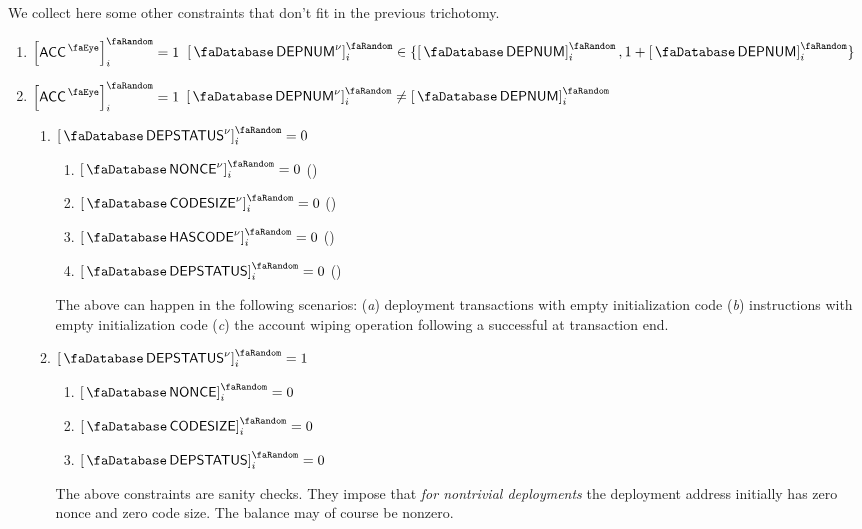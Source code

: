 We collect here some other constraints that don't fit in the previous trichotomy.
\begin{enumerate}
	\item
		\If $\order{\peekAccount} _{i} = 1$
		\Then $\order{\accDeploymentNumber \new }_{i} \in \{ \order{\accDeploymentNumber  }_{i}, 1 + \order{\accDeploymentNumber  }_{i} \}$
	\item
		\If $\order{\peekAccount} _{i} = 1$
		\et $\order{\accDeploymentNumber \new }_{i} \neq \order{\accDeploymentNumber  }_{i}$
		\begin{enumerate}
			\item
				\If $\order{\accDeploymentStatus \new }_{i} = 0$
				\Then
				\begin{enumerate}
					\item $\order{\accNonce        \new } _{i} = 0$ \quad (\trash)
					\item $\order{\accCodesize     \new } _{i} = 0$ \quad (\trash)
					\item $\order{\accHasCode      \new } _{i} = 0$ \quad (\trash)
					\item $\order{\accDeploymentStatus  } _{i} = 0$ \quad (\trash)
				\end{enumerate}
				\saNote{}
				The above can happen in the following scenarios:
				(\emph{a}) deployment transactions with empty initialization code
				(\emph{b})  instructions with empty initialization code
				(\emph{c}) the account wiping operation following a successful  at transaction end.
			\item
				\If $\order{\accDeploymentStatus \new }_{i} = 1$
				\Then
				\begin{enumerate}
					\item $\order{\accNonce             } _{i} = 0$
					\item $\order{\accCodesize          } _{i} = 0$
					\item $\order{\accDeploymentStatus  } _{i} = 0$
				\end{enumerate}
				\saNote{}
				The above constraints are sanity checks.
				They impose that \emph{for nontrivial deployments} the deployment address
				initially has zero nonce and zero code size.
				The balance may of course be nonzero.
		\end{enumerate}
\end{enumerate}
